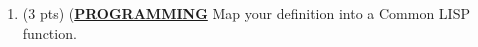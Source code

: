 \documentclass[12pt]{article}
\begin{document}
\begin{spacing}{1.5}
\begin{enumerate}
\begin{enumerate}
		      \end{enumerate}
		      		      
		\item (3 pts) (\uline{\textbf{PROGRAMMING}} Map your definition into a Common LISP function.\\
            
            	          
		      		              
	\end{enumerate}
\end{spacing}
\end{document}
